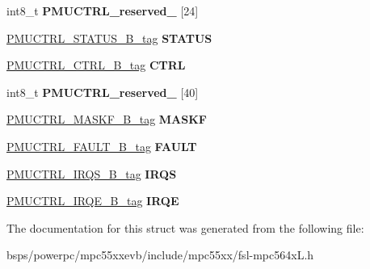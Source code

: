 \begin{DoxyCompactItemize}
\mbox{\label{structPMUCTRL__struct__tag_a64f39a0a754cf0b2d433b0d740c3c7dc}} 
int8\+\_\+t {\bfseries P\+M\+U\+C\+T\+R\+L\+\_\+reserved\+\_} \mbox{[}24\mbox{]}
\item 
\mbox{\label{structPMUCTRL__struct__tag_a3f1f0382995305290e5e67ca5ca1510e}} 
\mbox{\hyperlink{unionPMUCTRL__STATUS__32B__tag}{P\+M\+U\+C\+T\+R\+L\+\_\+\+S\+T\+A\+T\+U\+S\+\_\+B\+\_\+tag}} {\bfseries S\+T\+A\+T\+US}
\item 
\mbox{\label{structPMUCTRL__struct__tag_a2fc0ca5f95969a80e161304a45d38866}} 
\mbox{\hyperlink{unionPMUCTRL__CTRL__32B__tag}{P\+M\+U\+C\+T\+R\+L\+\_\+\+C\+T\+R\+L\+\_\+B\+\_\+tag}} {\bfseries C\+T\+RL}
\item 
\mbox{\label{structPMUCTRL__struct__tag_a2190a64caec75cda3cf71f77896e8952}} 
int8\+\_\+t {\bfseries P\+M\+U\+C\+T\+R\+L\+\_\+reserved\+\_} \mbox{[}40\mbox{]}
\item 
\mbox{\label{structPMUCTRL__struct__tag_a7489cf1ec773f0bddefee35e6a0a7a61}} 
\mbox{\hyperlink{unionPMUCTRL__MASKF__32B__tag}{P\+M\+U\+C\+T\+R\+L\+\_\+\+M\+A\+S\+K\+F\+\_\+B\+\_\+tag}} {\bfseries M\+A\+S\+KF}
\item 
\mbox{\label{structPMUCTRL__struct__tag_a4d478180db2de273808f4234ca03b84c}} 
\mbox{\hyperlink{unionPMUCTRL__FAULT__32B__tag}{P\+M\+U\+C\+T\+R\+L\+\_\+\+F\+A\+U\+L\+T\+\_\+B\+\_\+tag}} {\bfseries F\+A\+U\+LT}
\item 
\mbox{\label{structPMUCTRL__struct__tag_aa52e3683dda4cf69b0f662fa0597204a}} 
\mbox{\hyperlink{unionPMUCTRL__IRQS__32B__tag}{P\+M\+U\+C\+T\+R\+L\+\_\+\+I\+R\+Q\+S\+\_\+B\+\_\+tag}} {\bfseries I\+R\+QS}
\item 
\mbox{\label{structPMUCTRL__struct__tag_a2cd1b735562cf9ea5f94d73253fb772f}} 
\mbox{\hyperlink{unionPMUCTRL__IRQE__32B__tag}{P\+M\+U\+C\+T\+R\+L\+\_\+\+I\+R\+Q\+E\+\_\+B\+\_\+tag}} {\bfseries I\+R\+QE}
\end{DoxyCompactItemize}


The documentation for this struct was generated from the following file\+:\begin{DoxyCompactItemize}
\item 
bsps/powerpc/mpc55xxevb/include/mpc55xx/fsl-\/mpc564x\+L.\+h\end{DoxyCompactItemize}
